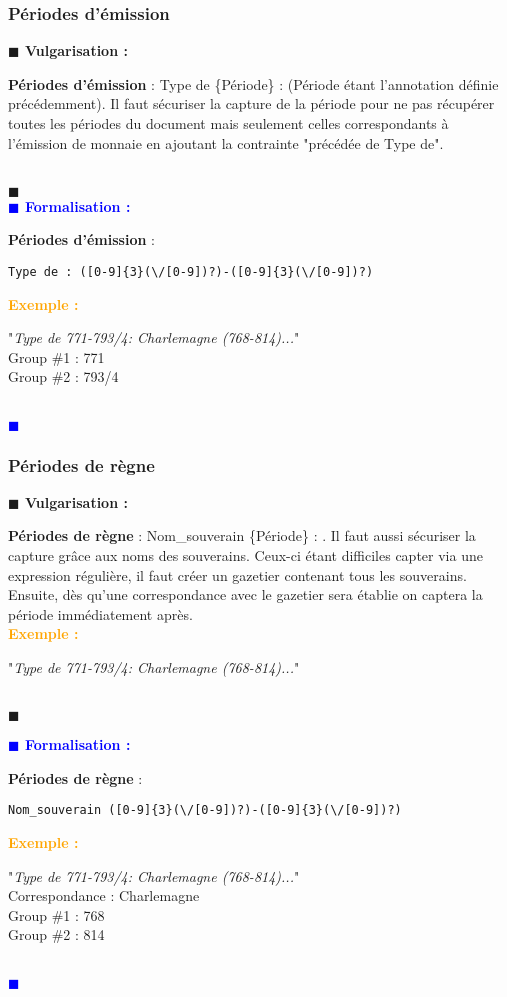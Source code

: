 \documentclass[a4paper, 11pt]{article}
\newenvironment{vulgarisation}
    {
    \textbf{\textcolor{dark-blue}{$\blacksquare$  Vulgarisation : \\}}

    }
    {
    ~\\\textcolor{dark-blue}{$\blacksquare$}\\
    }
\newenvironment{formalisation}
    {
    \textbf{\textcolor{blue}{$\blacksquare$  Formalisation : \\}}
    }
    {
    ~\\\textcolor{blue}{$\blacksquare$}\\
    }
\newenvironment{exemple}
    {
    \textbf{\textcolor{orange}{
    Exemple : \\}}
    }
    {\\
    }
\begin{document}
\subsubsection{Périodes d'émission}
\begin{vulgarisation}
\textbf{Périodes d'émission} : \og Type de \{Période\} : \fg{} (Période étant l'annotation définie précédemment).
Il faut sécuriser la capture de la période pour ne pas récupérer toutes les périodes du document mais seulement celles correspondants à l’émission de monnaie en ajoutant la contrainte "précédée de Type de".
\end{vulgarisation}
\begin{formalisation}
\textbf{Périodes d'émission} : 
\begin{verbatim}
Type de : ([0-9]{3}(\/[0-9])?)-([0-9]{3}(\/[0-9])?)
\end{verbatim}
\begin{exemple}
"\emph{Type de 771-793/4: Charlemagne (768-814)...}" \\
Group \#1 : 771 \\
Group \#2 : 793/4
\end{exemple}
\end{formalisation}

\subsubsection{Périodes de règne}
\begin{vulgarisation}
\textbf{Périodes de règne} : \og Nom\_souverain \{Période\} : \fg{}. Il faut aussi sécuriser la capture grâce aux noms des souverains. Ceux-ci étant difficiles capter via une expression régulière, il faut créer un gazetier contenant tous les souverains. Ensuite, dès qu'une correspondance avec le gazetier sera établie on captera la période immédiatement après.\\
\begin{exemple}
"\emph{Type de 771-793/4: Charlemagne (768-814)...}" 
\end{exemple}
\end{vulgarisation}

\begin{formalisation}
\textbf{Périodes de règne} : 
\begin{verbatim}
Nom_souverain ([0-9]{3}(\/[0-9])?)-([0-9]{3}(\/[0-9])?)
\end{verbatim}
\begin{exemple}
"\emph{Type de 771-793/4: Charlemagne (768-814)...}" \\
Correspondance : Charlemagne \\
Group \#1 : 768 \\
Group \#2 : 814
\end{exemple}
\end{formalisation}
\end{document}
